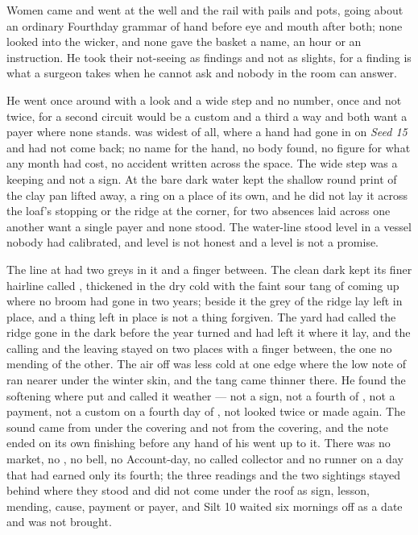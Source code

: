 Women came and went at the well and the rail with pails and pots, going about an ordinary Fourthday grammar of hand before eye and mouth after both; none looked into the wicker, and none gave the basket a name, an hour or an instruction. He took their not-seeing as findings and not as slights, for a finding is what a surgeon takes when he cannot ask and nobody in the room can answer.

He went once around  with a look and a wide step and no number, once and not twice, for a second circuit would be a custom and a third a way and both want a payer where none stands.  was widest of all, where a hand had gone in on \emph{Seed 15} and had not come back; no name for the hand, no body found, no figure for what any month had cost, no accident written across the space. The wide step was a keeping and not a sign. At  the bare dark water kept the shallow round print of the clay pan lifted away, a ring on a place of its own, and he did not lay it across the loaf's stopping or the ridge at the corner, for two absences laid across one another want a single payer and none stood. The water-line stood level in a vessel nobody had calibrated, and level is not honest and a level is not a promise.

The line at  had two greys in it and a finger between. The clean dark kept its finer hairline called , thickened in the dry cold with the faint sour tang of  coming up where no broom had gone in two years; beside it the grey of the ridge lay left in place, and a thing left in place is not a thing forgiven. The yard had called the ridge gone in the dark before the year turned and had left it where it lay, and the calling and the leaving stayed on two places with a finger between, the one no mending of the other. The air off  was less cold at one edge where the low note of  ran nearer under the winter skin, and the tang came thinner there. He found the softening where put and called it weather --- not a sign, not a fourth of , not a payment, not a custom on a fourth day of , not looked twice or made again. The sound came from under the covering and not from the covering, and the note ended on its own finishing before any hand of his went up to it. There was no market, no , no bell, no Account-day, no called collector and no runner on a day that had earned only its fourth; the three readings and the two sightings stayed behind where they stood and did not come under the roof as sign, lesson, mending, cause, payment or payer, and Silt 10 waited six mornings off as a date and was not brought.

